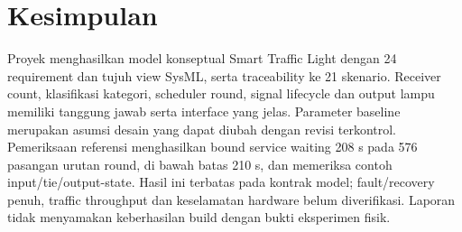 \section{Kesimpulan}
Proyek menghasilkan model konseptual Smart Traffic Light dengan 24 requirement dan tujuh view SysML, serta traceability ke 21 skenario. Receiver count, klasifikasi kategori, scheduler round, signal lifecycle dan output lampu memiliki tanggung jawab serta interface yang jelas. Parameter baseline merupakan asumsi desain yang dapat diubah dengan revisi terkontrol. Pemeriksaan referensi menghasilkan bound service waiting 208 s pada 576 pasangan urutan round, di bawah batas 210 s, dan memeriksa contoh input/tie/output-state. Hasil ini terbatas pada kontrak model; fault/recovery penuh, traffic throughput dan keselamatan hardware belum diverifikasi. Laporan tidak menyamakan keberhasilan build dengan bukti eksperimen fisik.
